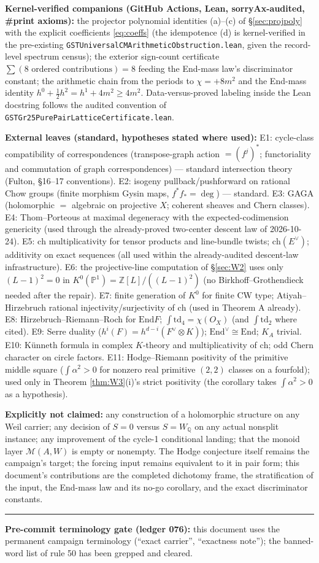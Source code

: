 \documentclass[11pt]{article}
\begin{document}
\textbf{Kernel-verified companions (GitHub Actions, Lean, sorryAx-audited, \#print axioms):} the projector
polynomial identities (a)--(c) of \S\ref{sec:projpoly} with the explicit coefficients \eqref{eq:coeffs} (the
idempotence (d) is kernel-verified in the pre-existing \texttt{GSTUniversalCMArithmeticObstruction.lean}, given the
record-level spectrum census); the exterior sign-count certificate $\sum(\text{8 ordered contributions})=8$
feeding the End-mass law's discriminator constant; the arithmetic chain from the periods to
$\chi=+8m^2$ and the End-mass identity $h^0+\tfrac12h^2=h^1+4m^2\ge4m^2$.
Data-versus-proved labeling inside the Lean docstring follows the audited convention of
\texttt{GSTGr25PurePairLatticeCertificate.lean}.

\textbf{External leaves (standard, hypotheses stated where used):}
E1: cycle-class compatibility of correspondences (transpose-graph action $=(f^j)^*$; functoriality and commutation
of graph correspondences) --- standard intersection theory (Fulton, \S16--17 conventions).
E2: isogeny pullback/pushforward on rational Chow groups (finite morphism Gysin maps, $f^*f_*=\deg$) --- standard.
E3: GAGA (holomorphic $=$ algebraic on projective $X$; coherent sheaves and Chern classes).
E4: Thom--Porteous at maximal degeneracy with the expected-codimension genericity (used through the already-proved
two-center descent law of 2026-10-24).
E5: $\mathrm{ch}$ multiplicativity for tensor products and line-bundle twists; $\mathrm{ch}(E^\vee)$; additivity on
exact sequences (all used within the already-audited descent-law infrastructure).
E6: the projective-line computation of \S\ref{sec:W2} uses only $(L-1)^2=0$ in $K^0(\mathbb{P}^1)=\mathbb{Z}[L]/((L-1)^2)$
(no Birkhoff--Grothendieck needed after the repair).
E7: finite generation of $K^0$ for finite CW type; Atiyah--Hirzebruch rational injectivity/surjectivity of
$\mathrm{ch}$ (used in Theorem A already).
E8: Hirzebruch--Riemann--Roch for $\mathrm{End}F$; $\int\mathrm{td}_4=\chi(O_X)$ (and $\int\mathrm{td}_2$ where cited).
E9: Serre duality ($h^i(F)=h^{d-i}(F^\vee\otimes K)$); $\mathrm{End}^\vee\cong\mathrm{End}$; $K_A$ trivial.
E10: K\"unneth formula in complex $K$-theory and multiplicativity of $\mathrm{ch}$; odd Chern character on circle
factors.
E11: Hodge--Riemann positivity of the primitive middle square ($\int\alpha^2>0$ for nonzero real primitive
$(2,2)$ classes on a fourfold); used only in Theorem \ref{thm:W3}(i)'s strict positivity (the corollary takes
$\int\alpha^2>0$ as a hypothesis).

\textbf{Explicitly not claimed:} any construction of a holomorphic structure on any Weil carrier; any decision of
$S=0$ versus $S=W_\mathbb{Q}$ on any actual nonsplit instance; any improvement of the cycle-1 conditional landing;
that the monoid layer $\mathcal{M}(A,W)$ is empty or nonempty. The Hodge conjecture itself remains the campaign's
target; the forcing input remains equivalent to it in pair form; this document's contributions are the completed
dichotomy frame, the stratification of the input, the End-mass law and its no-go corollary, and the exact
discriminator constants.

\vspace{2mm}
\noindent\rule{\textwidth}{0.4pt}
\vspace{1mm}

\noindent\textbf{Pre-commit terminology gate (ledger 076):} this document uses the permanent campaign terminology
(``exact carrier'', ``exactness note''); the banned-word list of rule 50 has been grepped and cleared.
\end{document}
